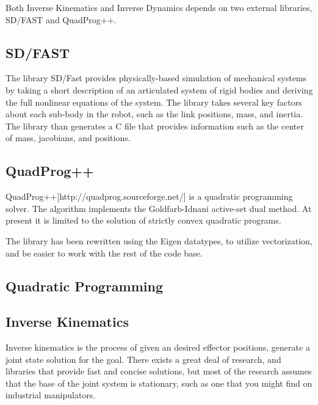 \documentclass[12pt]{report}
\begin{document}
Both Inverse Kinematics and Inverse Dynamics depends on two external libraries, SD/FAST and QuadProg++. 

\subsection{SD/FAST}
The library SD/Fast provides physically-based simulation of mechanical systems by taking a short description of an articulated system of rigid bodies and deriving the full nonlinear equations of the system. \cite{sdfast} The library takes several key factors about each sub-body in the robot, such as the link positions, mass, and inertia. The library than generates a C file that provides information such as the center of mass, jacobians, and positions. 

\subsection{QuadProg++}
QuadProg++[http://quadprog.sourceforge.net/] is a quadratic programming solver. The algorithm implements the Goldfarb-Idnani active-set dual method. At present it is limited to the solution of strictly convex quadratic programs. \cite{quadprog}

The library has been rewritten using the Eigen datatypes, to utilize vectorization, and be easier to work with the rest of the code base. 

\subsection{Quadratic Programming}



\subsection{Inverse Kinematics}


Inverse kinematics is the process of given an desired effector positions, generate a joint state solution for the goal. There exists a great deal of research, and libraries that provide fast and concise solutions, but most of the research assumes that the base of the joint system is stationary, such as one that you might find on industrial manipulators. 
\end{document}

